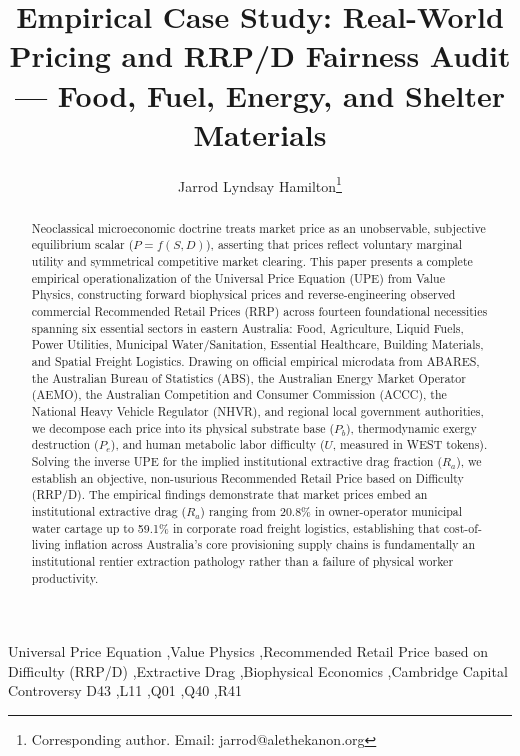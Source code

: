 \documentclass[preprint,12pt,authoryear]{elsarticle}
\begin{document}
\begin{frontmatter}

\title{Empirical Case Study: Real-World Pricing and RRP/D Fairness Audit --- Food, Fuel, Energy, and Shelter Materials}

\author{Jarrod Lyndsay Hamilton\footnote{Corresponding author. Email: jarrod@alethekanon.org}}
\address{Alethekanon Research Institute, Division 2: Societal Economics \& Macro-Micro Simulation, Coonabarabran, NSW 2357, Australia}

\begin{abstract}
Neoclassical microeconomic doctrine treats market price as an unobservable, subjective equilibrium scalar ($P = f(S, D)$), asserting that prices reflect voluntary marginal utility and symmetrical competitive market clearing. This paper presents a complete empirical operationalization of the Universal Price Equation (UPE) from Value Physics, constructing forward biophysical prices and reverse-engineering observed commercial Recommended Retail Prices (RRP) across fourteen foundational necessities spanning six essential sectors in eastern Australia: Food, Agriculture, Liquid Fuels, Power Utilities, Municipal Water/Sanitation, Essential Healthcare, Building Materials, and Spatial Freight Logistics. Drawing on official empirical microdata from ABARES, the Australian Bureau of Statistics (ABS), the Australian Energy Market Operator (AEMO), the Australian Competition and Consumer Commission (ACCC), the National Heavy Vehicle Regulator (NHVR), and regional local government authorities, we decompose each price into its physical substrate base ($P_b$), thermodynamic exergy destruction ($P_e$), and human metabolic labor difficulty ($U$, measured in WEST tokens). Solving the inverse UPE for the implied institutional extractive drag fraction ($R_a$), we establish an objective, non-usurious Recommended Retail Price based on Difficulty (RRP/D). The empirical findings demonstrate that market prices embed an institutional extractive drag ($R_a$) ranging from 20.8\% in owner-operator municipal water cartage up to 59.1\% in corporate road freight logistics, establishing that cost-of-living inflation across Australia's core provisioning supply chains is fundamentally an institutional rentier extraction pathology rather than a failure of physical worker productivity.
\end{abstract}

\begin{keyword}
Universal Price Equation \sep Value Physics \sep Recommended Retail Price based on Difficulty (RRP/D) \sep Extractive Drag \sep Biophysical Economics \sep Cambridge Capital Controversy
\JEL D43 \sep L11 \sep Q01 \sep Q40 \sep R41
\end{keyword}

\end{frontmatter}
\end{document}
